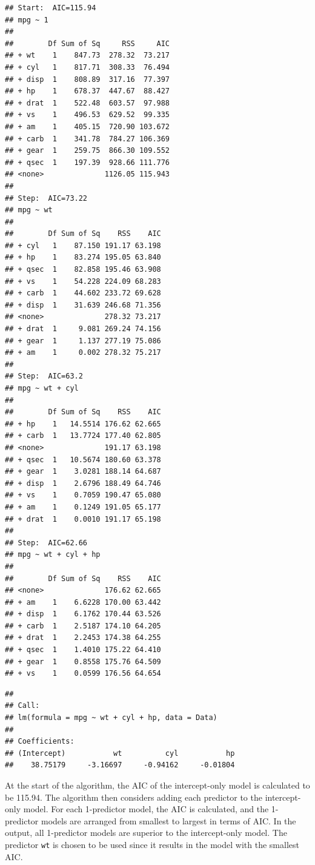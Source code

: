 \documentclass[
]{book}
\begin{document}
\begin{verbatim}
## Start:  AIC=115.94
## mpg ~ 1
## 
##        Df Sum of Sq     RSS     AIC
## + wt    1    847.73  278.32  73.217
## + cyl   1    817.71  308.33  76.494
## + disp  1    808.89  317.16  77.397
## + hp    1    678.37  447.67  88.427
## + drat  1    522.48  603.57  97.988
## + vs    1    496.53  629.52  99.335
## + am    1    405.15  720.90 103.672
## + carb  1    341.78  784.27 106.369
## + gear  1    259.75  866.30 109.552
## + qsec  1    197.39  928.66 111.776
## <none>              1126.05 115.943
## 
## Step:  AIC=73.22
## mpg ~ wt
## 
##        Df Sum of Sq    RSS    AIC
## + cyl   1    87.150 191.17 63.198
## + hp    1    83.274 195.05 63.840
## + qsec  1    82.858 195.46 63.908
## + vs    1    54.228 224.09 68.283
## + carb  1    44.602 233.72 69.628
## + disp  1    31.639 246.68 71.356
## <none>              278.32 73.217
## + drat  1     9.081 269.24 74.156
## + gear  1     1.137 277.19 75.086
## + am    1     0.002 278.32 75.217
## 
## Step:  AIC=63.2
## mpg ~ wt + cyl
## 
##        Df Sum of Sq    RSS    AIC
## + hp    1   14.5514 176.62 62.665
## + carb  1   13.7724 177.40 62.805
## <none>              191.17 63.198
## + qsec  1   10.5674 180.60 63.378
## + gear  1    3.0281 188.14 64.687
## + disp  1    2.6796 188.49 64.746
## + vs    1    0.7059 190.47 65.080
## + am    1    0.1249 191.05 65.177
## + drat  1    0.0010 191.17 65.198
## 
## Step:  AIC=62.66
## mpg ~ wt + cyl + hp
## 
##        Df Sum of Sq    RSS    AIC
## <none>              176.62 62.665
## + am    1    6.6228 170.00 63.442
## + disp  1    6.1762 170.44 63.526
## + carb  1    2.5187 174.10 64.205
## + drat  1    2.2453 174.38 64.255
## + qsec  1    1.4010 175.22 64.410
## + gear  1    0.8558 175.76 64.509
## + vs    1    0.0599 176.56 64.654
\end{verbatim}

\begin{verbatim}
## 
## Call:
## lm(formula = mpg ~ wt + cyl + hp, data = Data)
## 
## Coefficients:
## (Intercept)           wt          cyl           hp  
##    38.75179     -3.16697     -0.94162     -0.01804
\end{verbatim}

At the start of the algorithm, the AIC of the intercept-only model is calculated to be 115.94. The algorithm then considers adding each predictor to the intercept-only model. For each 1-predictor model, the AIC is calculated, and the 1-predictor models are arranged from smallest to largest in terms of AIC. In the output, all 1-predictor models are superior to the intercept-only model. The predictor \texttt{wt} is chosen to be used since it results in the model with the smallest AIC.
\end{document}
